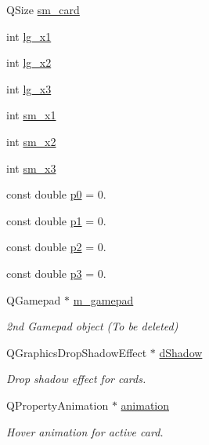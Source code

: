 \begin{DoxyCompactItemize}
\item 
Q\+Size \mbox{\hyperlink{classHomePage_a56de3b0498545be597799b5268b9ad63}{sm\+\_\+card}}
\item 
int \mbox{\hyperlink{classHomePage_af88e269cf45d6e071191ba6d2f397cc4}{lg\+\_\+x1}}
\item 
int \mbox{\hyperlink{classHomePage_a17245240c70b884bc7ea2689ab97615f}{lg\+\_\+x2}}
\item 
int \mbox{\hyperlink{classHomePage_a9004fd5e2e6a049b4c8c1f9b5a4b9331}{lg\+\_\+x3}}
\item 
int \mbox{\hyperlink{classHomePage_aee93e3642c2f71dd86bc04e8c78a70bf}{sm\+\_\+x1}}
\item 
int \mbox{\hyperlink{classHomePage_a7f16bbaaee0da040ea56f35b5b636ef6}{sm\+\_\+x2}}
\item 
int \mbox{\hyperlink{classHomePage_abd248b510f44173183825ee3f05f2604}{sm\+\_\+x3}}
\item 
const double \mbox{\hyperlink{classHomePage_ae6fc467e10a72695270fc48c446a9669}{p0}} = 0.
\item 
const double \mbox{\hyperlink{classHomePage_a5d8508866880bdd632891c47317c8657}{p1}} = 0.
\item 
const double \mbox{\hyperlink{classHomePage_a344d671a0307c4f453187682ad50598f}{p2}} = 0.
\item 
const double \mbox{\hyperlink{classHomePage_ac8dd42b64eb836d4bb92a05123ea24b0}{p3}} = 0.
\item 
Q\+Gamepad $\ast$ \mbox{\hyperlink{classHomePage_a10f488d4dde0b7dd002988adbba952ea}{m\+\_\+gamepad}}
\begin{DoxyCompactList}\small\item\em 2nd Gamepad object (To be deleted) \end{DoxyCompactList}\item 
Q\+Graphics\+Drop\+Shadow\+Effect $\ast$ \mbox{\hyperlink{classHomePage_a3c355759e9927e080473bd83a56eae07}{d\+Shadow}}
\begin{DoxyCompactList}\small\item\em Drop shadow effect for cards. \end{DoxyCompactList}\item 
Q\+Property\+Animation $\ast$ \mbox{\hyperlink{classHomePage_a3393be0eee7c46695fd059cc6a4fdfc7}{animation}}
\begin{DoxyCompactList}\small\item\em Hover animation for active card. \end{DoxyCompactList}\item 

\end{DoxyCompactItemize}
